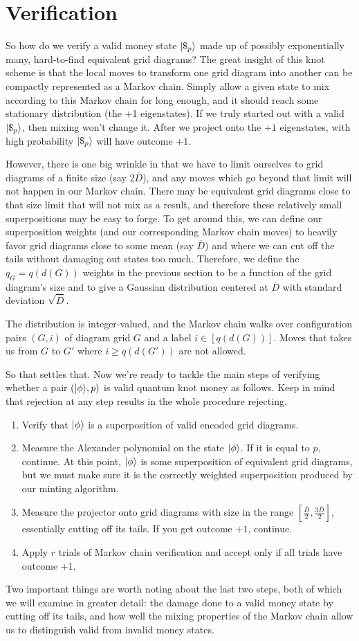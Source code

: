 \section{Verification}

So how do we verify a valid money state $|\$_p \rangle$ made up of possibly
exponentially many, hard-to-find
equivalent grid diagrams? The great insight of this knot scheme is that
the local moves to transform one grid diagram into another can be
compactly represented as a Markov chain. Simply allow a given state to
mix according to this Markov chain for long enough, and it should reach
some stationary distribution (the +1 eigenstates). If we truly started
out with a valid $|\$_p \rangle$, then mixing won't change it. After we
project onto the $+1$ eigenstates, with high probability $|\$_p \rangle$ will
have outcome $+1$.

However, there is one big wrinkle in that we have to limit ourselves
to grid diagrams of a finite size (say $2\overline{D}$), and any moves
which go beyond that limit will not happen in our Markov chain.
There may be equivalent grid diagrams close to that size limit that will
not mix as a result, and therefore these relatively small superpositions
may be easy to forge. To get around this, we can define our superposition
weights (and our corresponding Markov chain moves) to heavily favor
grid diagrams close to some mean (say $\overline{D}$) and where we can
cut off the tails without damaging out states too much. Therefore,
we define the $q_G=q(d(G))$ weights in the previous section to be a
function of the grid diagram's size and to give a
Gaussian distribution centered at $\overline{D}$ with standard deviation
$\sqrt{\overline{D}}$.

The distribution is integer-valued, and the Markov chain walks over
configuration pairs $(G,i)$ of diagram grid $G$ and a label
$i \in [q(d(G))]$. Moves that takes us from $G$ to $G'$ where
$i \ge q(d(G'))$ are not allowed.

So that settles that. Now we're ready to tackle 
the main steps of verifying whether a pair $(|\phi \rangle,p)$ is valid
quantum knot money as follows. Keep in mind that
rejection at any step results in
the whole procedure rejecting.

\begin{enumerate}
\item
Verify that $|\phi \rangle$ is a superposition of valid encoded grid diagrams.
\item
Measure the Alexander polynomial on the state $|\phi \rangle$. If it is equal to $p$,
continue. At this point, $|\phi \rangle$ is some superposition of
equivalent grid diagrams, but we must make sure it is the correctly weighted
superposition produced by our minting algorithm.
\item
Measure the projector onto grid diagrams with size in the range
$\left[ \frac{\overline{D}}{2}, \frac{3\overline{D}}{2} \right]$,
essentially cutting off its tails.
If you get outcome $+1$,
continue.
\item
Apply $r$ trials of
Markov chain verification and accept only if all trials have outcome +1.
\end{enumerate}

Two important things are worth noting about the last two steps, both of
which we
will examine in greater detail: the damage done to a valid money state by
cutting off its tails,
and how well the mixing properties of the Markov chain allow us
to distinguish valid from invalid money states.